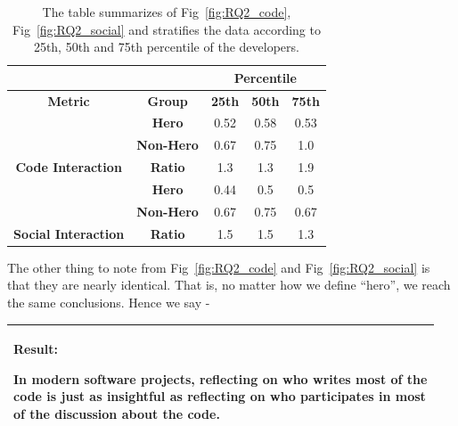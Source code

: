 \documentclass[smallextended]{svjour3}
\newenvironment{result}
{\vspace{0.15cm}
\noindent\begin{minipage}{\linewidth}
\begin{center}
\arrayrulecolor{lightgray}
\begin{tabular}{|p{0.95\linewidth}|}
\hline%
\rowcolor{gray!50}%
\textbf{Result:}~%
}
{\\\hline
\end{tabular}
\end{center}
\end{minipage}
\vspace{0.15cm}
}
\begin{document}
\begin{table}[!t]
\caption{The table summarizes of Fig~\ref{fig:RQ2_code}, Fig~\ref{fig:RQ2_social} and stratifies the data according to 25th, 50th and 75th percentile of the developers.}
\label{tbl:team_size}
\begin{center}
\begin{tabular}{|c|c|c|c|c|}
\hline
\rowcolor[HTML]{EFEFEF} 
\textbf{}                                     & \textbf{}         & \multicolumn{3}{c|}{\cellcolor[HTML]{EFEFEF}\textbf{Percentile}} \\ \hline
\rowcolor[HTML]{EFEFEF} 
\textbf{Metric}                               & \textbf{Group}    & \textbf{25th}        & \textbf{50th}       & \textbf{75th}       \\ \hline
                                              & \textbf{Hero}     & 0.52                 & 0.58                & 0.53                \\ \cline{2-5} 
                                              & \textbf{Non-Hero} & 0.67                  & 0.75                 & 1.0                 \\ \cline{2-5} 
\multirow{-3}{*}{\textbf{Code Interaction}}   & \textbf{Ratio}    & 1.3                  & 1.3                 & 1.9                 \\ \hline
                                              & \textbf{Hero}     & 0.44                  & 0.5                 & 0.5                 \\ \cline{2-5} 
                                              & \textbf{Non-Hero} & 0.67                 & 0.75                & 0.67                \\ \cline{2-5} 
\multirow{-3}{*}{\textbf{Social Interaction}} & \textbf{Ratio}    & 1.5                  & 1.5                 & 1.3                 \\ \hline
\end{tabular}
\end{center}%
\end{table}


The other thing to note from 
Fig~\ref{fig:RQ2_code} and Fig~\ref{fig:RQ2_social}
is that they are nearly identical.
That is, no matter how we define ``hero'',
we reach the same conclusions.
Hence we say -  

\begin{result}
In modern software projects,
 reflecting on
  who writes most of the code is just as insightful
  as reflecting on  who participates in most
of the discussion about the code.
\end{result}
\end{document}

